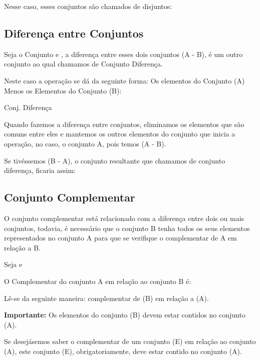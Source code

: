 \begin{multicols*}{2}
	Nesse caso, esses conjuntos são chamados de disjuntos:


	\subsection{Diferença entre Conjuntos}

	Seja o Conjunto  e , a diferença entre esses dois conjuntos (A - B), é um outro conjunto ao qual chamamos de Conjunto Diferença.

	Neste caso a operação se dá da seguinte forma: Os elementos do Conjunto (A) Menos os Elementos do Conjunto (B):

	Conj. Diferença 

	Quando fazemos a diferença entre conjuntos, eliminamos os elementos que são comuns entre eles e mantemos os outros elementos do conjunto que inicia a operação, no caso, o conjunto A, pois temos (A - B).

	Se tivéssemos (B - A), o conjunto resultante que chamamos de conjunto diferença, ficaria assim:


	\subsection{Conjunto Complementar}

	O conjunto complementar está relacionado com a diferença entre dois ou mais conjuntos, todavia, é necessário que o conjunto B tenha todos os seus elementos representados no conjunto A para que se verifique o complementar de A em relação a B.

	Seja  e 

	O Complementar do conjunto A em relação ao conjunto B é:


	Lê-se da seguinte maneira: complementar de (B) em relação a (A).

	\textbf{Importante:} Os elementos do conjunto (B) devem estar contidos no conjunto (A).

	Se desejásemos saber o complementar de um conjunto (E) em relação ao conjunto (A), este conjunto (E), obrigatoriamente, deve estar contido no conjunto (A).


\end{multicols*}
